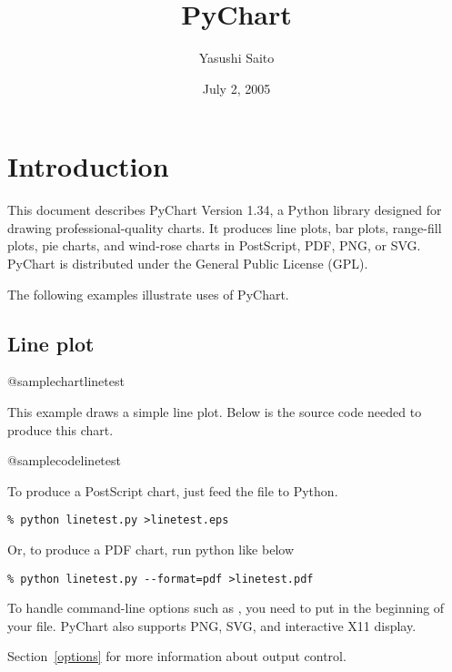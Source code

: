 \documentclass{howto}
\title{PyChart}
\author{Yasushi Saito}
\date{July 2, 2005}
\newcommand{\pychart}{PyChart}
\newcommand{\pyversion}{1.34}
\newcommand{\secref}[1]{Section~\ref{#1}}
\begin{document}
\maketitle

\section{Introduction}\label{introduction}


This document describes \pychart{} Version \pyversion{}, a Python library
designed for drawing professional-quality charts. It produces line
plots, bar plots, range-fill plots, pie charts, and wind-rose charts
in PostScript, PDF,
PNG, or SVG.  \pychart{} is distributed under the General Public License (GPL).


\begin{seealso*}
\end{seealso*}

The following examples illustrate uses of \pychart{}.

\subsection{Line plot}

@samplechart{linetest}

This example draws a simple line plot. Below is the source code needed to
produce this chart.

@samplecode{linetest}

To produce a PostScript chart, just feed the file to Python.

\begin{verbatim}
% python linetest.py >linetest.eps
\end{verbatim}

Or, to produce a PDF chart, run python like below

\begin{verbatim}
% python linetest.py --format=pdf >linetest.pdf
\end{verbatim}

To handle command-line options such as ,
you need to put  in the beginning of your file.
\pychart{} also supports PNG, SVG, and interactive X11 display.
\begin{seealso}
 \secref{options} for more information about output control.
\end{seealso}
\end{document}
